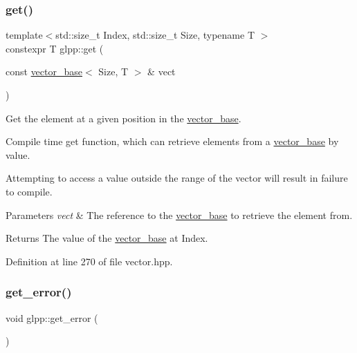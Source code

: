 \subsubsection{\texorpdfstring{get()}{get()}}
{\footnotesize\ttfamily template$<$std\+::size\+\_\+t Index, std\+::size\+\_\+t Size, typename T $>$ \\
constexpr T glpp\+::get (\begin{DoxyParamCaption}\item[{const \hyperlink{classglpp_1_1vector__base}{vector\+\_\+base}$<$ Size, T $>$ \&}]{vect }\end{DoxyParamCaption})\hspace{0.3cm}{\ttfamily [noexcept]}}



Get the element at a given position in the \hyperlink{classglpp_1_1vector__base}{vector\+\_\+base}. 

Compile time get function, which can retrieve elements from a \hyperlink{classglpp_1_1vector__base}{vector\+\_\+base} by value.

Attempting to access a value outside the range of the vector will result in failure to compile. 


\begin{DoxyParams}{Parameters}
{\em vect} & The reference to the \hyperlink{classglpp_1_1vector__base}{vector\+\_\+base} to retrieve the element from. \\
\hline
\end{DoxyParams}
\begin{DoxyReturn}{Returns}
The value of the \hyperlink{classglpp_1_1vector__base}{vector\+\_\+base} at {\ttfamily Index}. 
\end{DoxyReturn}


Definition at line 270 of file vector.\+hpp.

\mbox{\label{namespaceglpp_a40e9dba1fac476445cacac9d524fa623}} 
\subsubsection{\texorpdfstring{get\+\_\+error()}{get\_error()}}
{\footnotesize\ttfamily void glpp\+::get\+\_\+error (\begin{DoxyParamCaption}{ }\end{DoxyParamCaption})}



